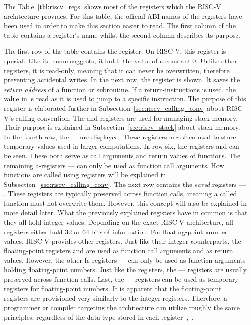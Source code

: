 The Table~\ref{tbl:riscv_regs} shows most of the registers which the RISC-V architecture provides.
For this table, the official ABI names of the registers have been used in order to make this section easier to read.
The first column of the table contains a register's name whilst the second column describes its purpose.

The first row of the table contains the  register.
On RISC-V, this register is special.
Like its name suggests, it holds the value of a constant 0.
Unlike other registers, it is read-only, meaning that it can never be overwritten, therefore preventing accidental writes.
In the next row, the  register is shown.
It saves the \emph{return address} of a function or subroutine.
If a return-instructions is used, the value in  is read as it is used to jump to a specific instruction.
The purpose of this register is elaborated further in Subsection~\ref{sec:riscv_calling_conv} about RISC-V's calling convention.
The  and  registers are used for managing stack memory.
Their purpose is explained in Subsection~\ref{sec:riscv_stack} about stack memory.
In the fourth row, the  —  are displayed.
These registers are often used to store temporary values used in larger computations.
In row six, the registers  and  can be seen.
These both serve as call arguments and return values of functions.
The remaining a-registers  —  can only be used as function call arguments.
How functions are called using registers will be explained in Subsection~\ref{sec:riscv_calling_conv}.
The next row contains the \emph{saved} registers  — .
These registers are typically preserved across function calls, meaning a called function must not overwrite them.
However, this concept will also be explained in more detail later. 
What the previously explained registers have in common is that they all hold integer values.
Depending on the exact RISC-V architecture, all registers either hold 32 or 64 bits of information.
For floating-point number values, RISC-V provides other registers.
Just like their integer counterparts, the floating-point registers  and  are used as function call arguments and as return values.
However, the other fa-registers  —  can only be used as function arguments holding floating-point numbers.
Just like the  registers, the  —  registers are usually preserved across function calls.
Last, the  —  registers can be used as temporary registers for floating-point numbers.
It is apparent that the floating-point registers are provisioned very similarly to the integer registers.
Therefore, a programmer or compiler targeting the architecture can utilize roughly the same principles,
regardless of the data-type stored in each register~\cite[pp.~18f,p.~34]{Patterson2017},~\cite[p~.155]{Waterman2019}.

